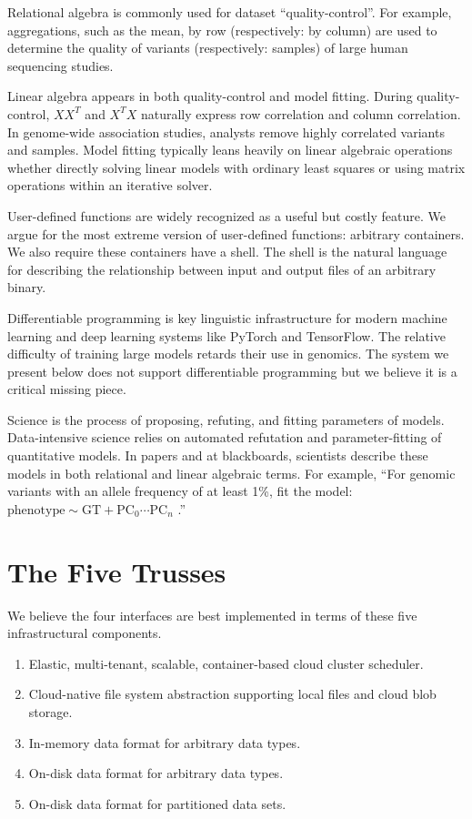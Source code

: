 \documentclass[10pt,a4paper%
]{article}
\begin{document}
Relational algebra is commonly used for dataset ``quality-control''. For example, aggregations, such as the mean, by row (respectively: by column) are used to determine the quality of variants (respectively: samples) of large human sequencing studies.

Linear algebra appears in both quality-control and model fitting.
During quality-control, $XX^T$ and $X^TX$ naturally express row correlation and column correlation.
In genome-wide association studies, analysts remove highly correlated variants and samples.
Model fitting typically leans heavily on linear algebraic operations whether directly solving linear models with ordinary least squares or using matrix operations within an iterative solver.

User-defined functions are widely recognized as a useful but costly feature.
We argue for the most extreme version of user-defined functions: arbitrary containers.
We also require these containers have a shell.
The shell is the natural language for describing the relationship between input and output files of an arbitrary binary.

Differentiable programming is key linguistic infrastructure for modern machine learning and deep learning systems like PyTorch and TensorFlow.
The relative difficulty of training large models retards their use in genomics.
The system we present below does not support differentiable programming but we believe it is a critical missing piece.

Science is the process of proposing, refuting, and fitting parameters of models.
Data-intensive science relies on automated refutation and parameter-fitting of quantitative models.
In papers and at blackboards, scientists describe these models in both relational and linear algebraic terms.
For example, ``For genomic variants with an allele frequency of at least 1\%, fit the model:
$\mathrm{phenotype} \sim \mathrm{GT} + \mathrm{PC}_0 \cdots \mathrm{PC}_n$
.''

\section{The Five Trusses}

We believe the four interfaces are best implemented in terms of these five infrastructural
components.

\begin{enumerate}
\item Elastic, multi-tenant, scalable, container-based cloud cluster scheduler.
\item Cloud-native file system abstraction supporting local files and cloud blob storage.
\item In-memory data format for arbitrary data types.
\item On-disk data format for arbitrary data types.
\item On-disk data format for partitioned data sets.
\end{enumerate}
\end{document}
